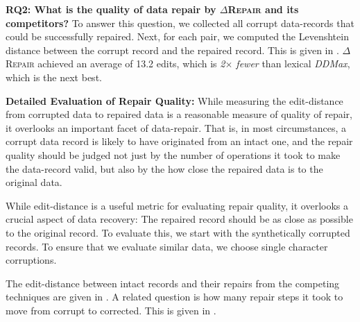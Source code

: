 \documentclass[acmsmall,screen,review,anonymous]{acmart}
\newcommand{\dtask}{data repair\xspace}
\newcommand{\approach}{\textsc{$\Delta$Repair}\xspace}
\newcommand{\ddmax}{\textit{DDMax}\xspace}
\newcommand{\drepair}{\approach}
\begin{document}
\noindent\textbf{RQ2: What is the quality of \dtask by \drepair and its competitors?}
To answer this question, we collected all corrupt data-records that could be
successfully repaired. Next, for each pair, we computed the Levenshtein distance
between the corrupt record and the repaired record. This is given in
.
\drepair achieved an average of 13.2 edits, which is \emph{2$\times$ fewer} than
lexical \ddmax, which is the next best.


\noindent\textbf{Detailed Evaluation of Repair Quality:}
While measuring the edit-distance from corrupted data to repaired data is a
reasonable measure of quality of repair, it overlooks an important facet
of data-repair. That is, in most circumstances, a corrupt data record is likely
to have originated from an intact one, and the repair quality should be judged
not just by the number of operations it took to make the data-record valid, but
also by the how close the repaired data is to the original data.

While edit-distance is a useful metric for evaluating repair quality,
it overlooks a crucial aspect of data recovery: The repaired record
should be as close as possible to the original record.
To evaluate this, we start with the synthetically corrupted records.
To ensure that we evaluate similar data, we choose single character
corruptions.

The edit-distance between intact records and their repairs from the competing
techniques are given in . A related question 
is how many repair steps it took to move from corrupt to corrected. This
is given in .

% 
% 
% 
% 
\end{document}
